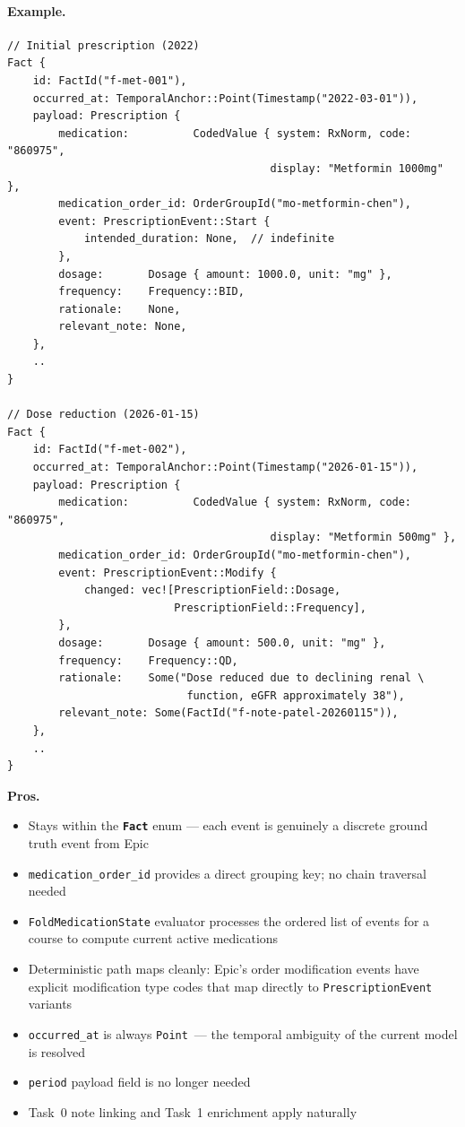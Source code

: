 \documentclass[11pt]{article}
\newcommand{\entity}[1]{\texttt{\textbf{#1}}}
\newcommand{\field}[1]{\texttt{#1}}
\newenvironment{prosbox}{%
  \begin{mdframed}[backgroundcolor=notegreen,
    linecolor=noteborder, linewidth=1pt,
    innertopmargin=8pt, innerbottommargin=8pt,
    innerleftmargin=10pt, innerrightmargin=10pt]
  \small
}{%
  \end{mdframed}
}
\begin{document}
\paragraph{Example.}

\begin{lstlisting}
// Initial prescription (2022)
Fact {
    id: FactId("f-met-001"),
    occurred_at: TemporalAnchor::Point(Timestamp("2022-03-01")),
    payload: Prescription {
        medication:          CodedValue { system: RxNorm, code: "860975",
                                         display: "Metformin 1000mg" },
        medication_order_id: OrderGroupId("mo-metformin-chen"),
        event: PrescriptionEvent::Start {
            intended_duration: None,  // indefinite
        },
        dosage:       Dosage { amount: 1000.0, unit: "mg" },
        frequency:    Frequency::BID,
        rationale:    None,
        relevant_note: None,
    },
    ..
}

// Dose reduction (2026-01-15)
Fact {
    id: FactId("f-met-002"),
    occurred_at: TemporalAnchor::Point(Timestamp("2026-01-15")),
    payload: Prescription {
        medication:          CodedValue { system: RxNorm, code: "860975",
                                         display: "Metformin 500mg" },
        medication_order_id: OrderGroupId("mo-metformin-chen"),
        event: PrescriptionEvent::Modify {
            changed: vec![PrescriptionField::Dosage,
                          PrescriptionField::Frequency],
        },
        dosage:       Dosage { amount: 500.0, unit: "mg" },
        frequency:    Frequency::QD,
        rationale:    Some("Dose reduced due to declining renal \
                            function, eGFR approximately 38"),
        relevant_note: Some(FactId("f-note-patel-20260115")),
    },
    ..
}
\end{lstlisting}

\begin{prosbox}
\textbf{Pros.}
\begin{itemize}[noitemsep]
  \item Stays within the \entity{Fact} enum --- each event is genuinely
    a discrete ground truth event from Epic
  \item \field{medication\_order\_id} provides a direct grouping key;
    no chain traversal needed
  \item \field{FoldMedicationState} evaluator processes the ordered
    list of events for a course to compute current active medications
  \item Deterministic path maps cleanly: Epic's order modification
    events have explicit modification type codes that map directly to
    \field{PrescriptionEvent} variants
  \item \field{occurred\_at} is always \field{Point}~--- the temporal
    ambiguity of the current model is resolved
  \item \field{period} payload field is no longer needed
  \item Task~0 note linking and Task~1 enrichment apply naturally
\end{itemize}
\end{prosbox}
\end{document}
